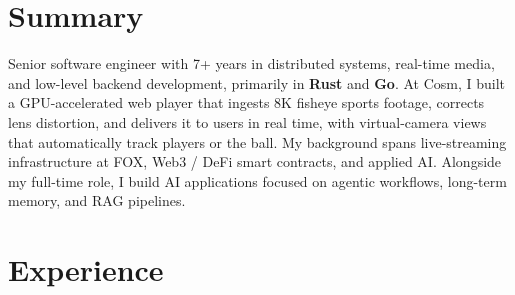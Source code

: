 \documentclass[letterpaper]{twentysecondcv} %
\begin{document}
\makeprofile %

\section{Summary}

Senior software engineer with 7+ years in distributed systems, real-time media, and
low-level backend development, primarily in \textbf{Rust} and \textbf{Go}. At Cosm, I built a
GPU-accelerated web player that ingests 8K fisheye sports footage, corrects lens distortion,
and delivers it to users in real time, with virtual-camera views that automatically track
players or the ball. My background spans live-streaming infrastructure at FOX, Web3 / DeFi
smart contracts, and applied AI. Alongside my full-time role, I build AI applications focused
on agentic workflows, long-term memory, and RAG pipelines.


\section{Experience}
\end{document}
